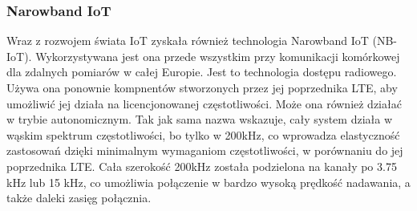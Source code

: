 \subsubsection{Narowband IoT}
Wraz z rozwojem świata IoT zyskała również technologia Narowband IoT (NB-IoT). Wykorzystywana jest ona przede wszystkim przy komunikacji komórkowej dla zdalnych pomiarów w całej Europie. Jest to technologia dostępu radiowego. Używa ona ponownie kompnentów stworzonych przez jej poprzednika LTE, aby umożliwić jej działa na licencjonowanej częstotliwości. Może ona również działać w trybie autonomicznym. Tak jak sama nazwa wskazuje, cały system działa w wąskim spektrum częstotliwości, bo tylko w 200kHz, co wprowadza elastyczność zastosowań dzięki minimalnym wymaganiom częstotliwości, w porównaniu do jej poprzednika LTE. Cała szerokość 200kHz została podzielona na kanały po 3.75 kHz lub 15 kHz, co umożliwia połączenie w bardzo wysoką prędkość nadawania, a także daleki zasięg połącznia. \cite{nbiot-article}  

